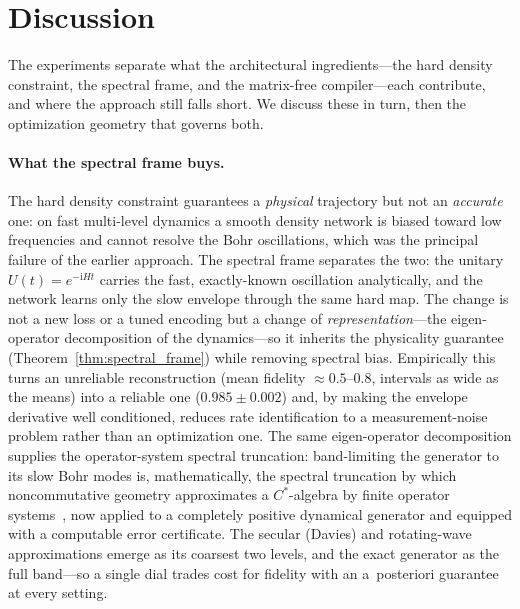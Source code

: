 \documentclass[11pt]{article}
\newcommand{\ii}{\mathrm{i}}
\newcommand{\sync}[1]{#1}
\begin{document}
\section{Discussion}
\label{sec:discussion}

The experiments separate what the architectural ingredients---the hard density constraint, the spectral frame, and the matrix-free compiler---each contribute, and where the approach still falls short. We discuss these in turn, then the optimization geometry that governs both.

\paragraph{What the spectral frame buys.}
The hard density constraint guarantees a \emph{physical} trajectory but not an \emph{accurate} one: on fast multi-level dynamics a smooth density network is biased toward low frequencies and cannot resolve the Bohr oscillations, which was the principal failure of the earlier approach. The spectral frame separates the two: the unitary $U(t)=e^{-\ii Ht}$ carries the fast, exactly-known oscillation analytically, and the network learns only the slow envelope through the same hard map. The change is not a new loss or a tuned encoding but a change of \emph{representation}---the eigen-operator decomposition of the dynamics---so it inherits the physicality guarantee (Theorem~\ref{thm:spectral_frame}) while removing spectral bias. Empirically this turns an unreliable reconstruction (mean fidelity $\approx0.5$--$0.8$, intervals as wide as the means) into a reliable one ($\sync{0.985}\pm\sync{0.002}$) and, by making the envelope derivative well conditioned, reduces rate identification to a measurement-noise problem rather than an optimization one. The same eigen-operator decomposition supplies the operator-system spectral truncation: band-limiting the generator to its slow Bohr modes is, mathematically, the spectral truncation by which noncommutative geometry approximates a $C^*$-algebra by finite operator systems~\cite{connes2021spectral,hashimoto2024spectral}, now applied to a completely positive dynamical generator and equipped with a computable error certificate. The secular (Davies) and rotating-wave approximations emerge as its coarsest two levels, and the exact generator as the full band---so a single dial trades cost for fidelity with an a~posteriori guarantee at every setting.
\end{document}
